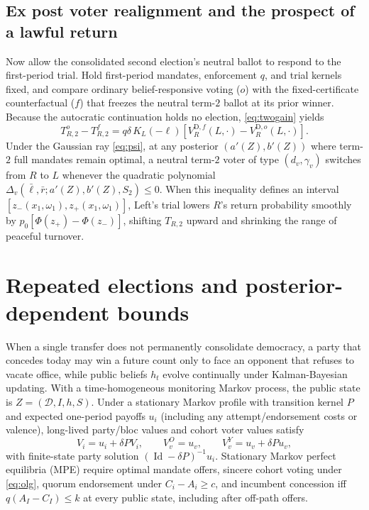 \documentclass[11pt,letterpaper]{article}
\newcommand{\D}{\mathrm D}
\newcommand{\Id}{\operatorname{Id}}
\begin{document}
\subsection{Ex post voter realignment and the prospect of a lawful return}\label{sec:counter}

Now allow the consolidated second election's neutral ballot to respond to the first-period trial. Hold first-period mandates, enforcement $q$, and trial kernels fixed, and compare ordinary belief-responsive voting ($o$) with the fixed-certificate counterfactual ($f$) that freezes the neutral term-$2$ ballot at its prior winner. Because the autocratic continuation holds no election, \eqref{eq:twogain} yields
\begin{equation}
 T_{R,2}^{o}-T_{R,2}^{f}
 =q\delta\,K_L(-\ell)\!\left[V_R^{\D,f}(L,\cdot)-V_R^{\D,o}(L,\cdot)\right].
 \label{eq:electoralgain}
\end{equation}
Under the Gaussian ray \eqref{eq:psi}, at any posterior $(a'(Z),b'(Z))$ where term-$2$ full mandates remain optimal, a neutral term-$2$ voter of type $(d_v,\gamma_v)$ switches from $R$ to $L$ whenever the quadratic polynomial $\Delta_v(\bar\ell,\bar r;a'(Z),b'(Z),S_2)\le 0$. When this inequality defines an interval $[z_-(x_1,\omega_1),z_+(x_1,\omega_1)]$, Left's trial lowers $R$'s return probability smoothly by $p_0[\Phi(z_+)-\Phi(z_-)]$, shifting $T_{R,2}$ upward and shrinking the range of peaceful turnover.

\section{Repeated elections and posterior-dependent bounds}\label{sec:stationary}

When a single transfer does not permanently consolidate democracy, a party that concedes today may win a future count only to face an opponent that refuses to vacate office, while public beliefs $h_t$ evolve continually under Kalman-Bayesian updating. With a time-homogeneous monitoring Markov process, the public state is $Z=(\mathcal D,I,h,S)$. Under a stationary Markov profile with transition kernel $P$ and expected one-period payoffs $u_i$ (including any attempt/endorsement costs or valence), long-lived party/bloc values and cohort voter values satisfy
\begin{equation}
 V_i=u_i+\delta PV_i,\qquad V_v^O=u_v,\qquad
 V_v^Y=u_v+\delta P u_v ,
 \label{eq:bellman}
\end{equation}
with finite-state party solution $(\Id-\delta P)^{-1}u_i$. Stationary Markov perfect equilibria (MPE) require optimal mandate offers, sincere cohort voting under \eqref{eq:olg}, quorum endorsement under $C_i-A_i\ge c$, and incumbent concession iff $q(A_I-C_I)\le k$ at every public state, including after off-path offers.
\end{document}
